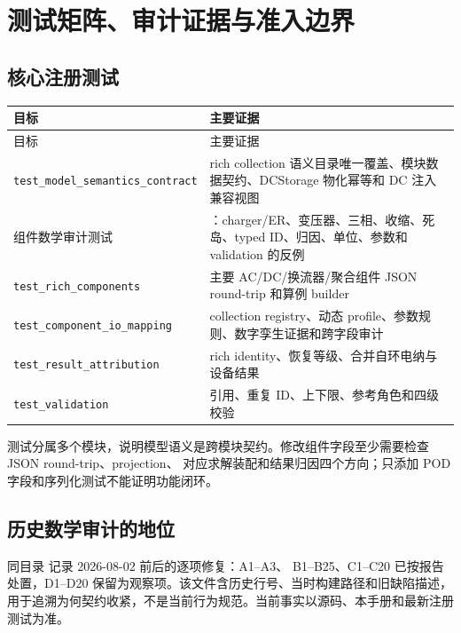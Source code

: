 \section{测试矩阵、审计证据与准入边界}

\subsection{核心注册测试}

\begin{center}\footnotesize
\begin{longtable}{@{}L{4.8cm}L{10.4cm}@{}}
\toprule 目标 & 主要证据\\\midrule
\endfirsthead
\toprule 目标 & 主要证据\\\midrule\endhead
\texttt{test\_model\_semantics\_contract} & rich collection 语义目录唯一覆盖、模块数据契约、DCStorage 物化幂等和 DC 注入兼容视图\\
组件数学审计测试 & ：charger/ER、变压器、三相、收缩、死岛、typed ID、归因、单位、参数和 validation 的反例\\
\texttt{test\_rich\_components} & 主要 AC/DC/换流器/聚合组件 JSON round-trip 和算例 builder\\
\texttt{test\_component\_io\_mapping} & collection registry、动态 profile、参数规则、数字孪生证据和跨字段审计\\
\texttt{test\_result\_attribution} & rich identity、恢复等级、合并自环电纳与设备结果\\
\texttt{test\_validation} & 引用、重复 ID、上下限、参考角色和四级校验\\
\bottomrule
\end{longtable}
\end{center}

测试分属多个模块，说明模型语义是跨模块契约。修改组件字段至少需要检查 JSON round-trip、projection、
对应求解装配和结果归因四个方向；只添加 POD 字段和序列化测试不能证明功能闭环。

\subsection{历史数学审计的地位}

同目录  记录 2026-08-02 前后的逐项修复：A1--A3、
B1--B25、C1--C20 已按报告处置，D1--D20 保留为观察项。该文件含历史行号、当时构建路径和旧缺陷描述，
用于追溯为何契约收紧，不是当前行为规范。当前事实以源码、本手册和最新注册测试为准。

